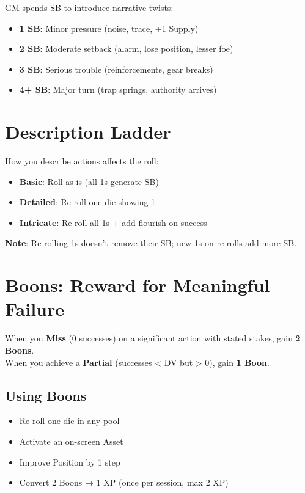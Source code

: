 \documentclass[11pt]{article}
\begin{document}
\begin{fatebox}
GM spends SB to introduce narrative twists:
\begin{itemize}
    \item \textbf{1 SB}: Minor pressure (noise, trace, +1 Supply)
    \item \textbf{2 SB}: Moderate setback (alarm, lose position, lesser foe)
    \item \textbf{3 SB}: Serious trouble (reinforcements, gear breaks)
    \item \textbf{4+ SB}: Major turn (trap springs, authority arrives)
\end{itemize}
\end{fatebox}

\section{Description Ladder}

How you describe actions affects the roll:
\begin{itemize}
    \item \textbf{Basic}: Roll as-is (all 1s generate SB)
    \item \textbf{Detailed}: Re-roll one die showing 1
    \item \textbf{Intricate}: Re-roll all 1s + add flourish on success
\end{itemize}

\textbf{Note}: Re-rolling 1s doesn't remove their SB; new 1s on re-rolls add more SB.

\section{Boons: Reward for Meaningful Failure}

When you \textbf{Miss} (0 successes) on a significant action with stated stakes, gain \textbf{2 Boons}.\\
When you achieve a \textbf{Partial} (successes < DV but > 0), gain \textbf{1 Boon}.

\subsection{Using Boons}
\begin{itemize}
    \item Re-roll one die in any pool
    \item Activate an on-screen Asset
    \item Improve Position by 1 step
    \item Convert 2 Boons → 1 XP (once per session, max 2 XP)
\end{itemize}
\end{document}
